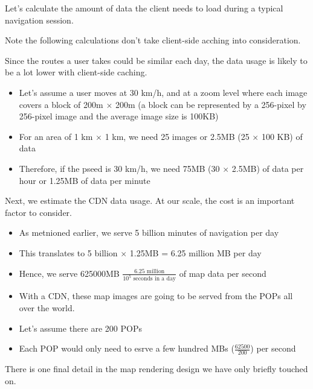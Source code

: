\documentclass{report}
\newenvironment{defbox}[1]{%
  \tcolorbox[
    colback=black!5,
    colframe=darkgray,
    title=#1
  ]
}{%
  \endtcolorbox
}
\theoremstyle{definition}
\begin{document}
Let's calculate the amount of data the client needs to load during a typical navigation session.

Note the following calculations don't take client-side acching into consideration.

Since the routes a user takes could be similar each day, the data usage is likely to be a lot lower with client-side caching.

\begin{defbox}{Data usage}
\begin{itemize}
\item
Let's assume a user moves at 30 km/h, and at a zoom level where each image covers a block of 200m $\times$ 200m (a block can be represented by a 256-pixel by 256-pixel image and the average image size is 100KB)
\item
For an area of 1 km $\times$ 1 km, we need 25 images or 2.5MB (25 $\times$ 100 KB) of data
\item
Therefore, if the pseed is 30 km/h, we need 75MB  (30 $\times$ 2.5MB) of data per hour or 1.25MB of data per minute
\end{itemize}
\end{defbox}

Next, we estimate the CDN data usage. At our scale, the cost is an important factor to consider.

\begin{defbox}{Traffic through CDN}
\begin{itemize}
\item
As metnioned earlier, we serve 5 billion minutes of navigation per day
\item
This translates to 5 billion $\times$ 1.25MB = 6.25 million MB per day
\item
Hence, we serve 625000MB $\frac{6.25 \text{ million}}{10^5 \text{ seconds in a day}}$ of map data per second
\item
With a CDN, these map images are going to be served from the POPs all over the world.
\item
Let's assume there are 200 POPs
\item
Each POP would only need to esrve a few hundred MBs ($\frac{62500}{200}$) per second
\end{itemize}
\end{defbox}

There is one final detail in the map rendering design we have only briefly touched on.
\end{document}
